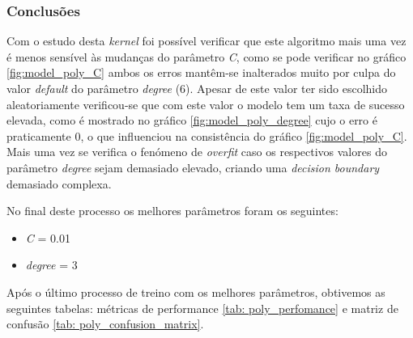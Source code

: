 \subsubsection{Conclusões}
Com o estudo desta \textit{kernel} foi possível verificar que este algoritmo mais uma vez é menos sensível às mudanças do parâmetro \textit{C}, como se pode verificar no gráfico \ref{fig:model_poly_C} ambos os erros mantêm-se inalterados muito por culpa do valor \textit{default} do parâmetro \textit{degree} (6). Apesar de este valor ter sido escolhido aleatoriamente verificou-se que com este valor o modelo tem um taxa de sucesso elevada, como é mostrado no gráfico \ref{fig:model_poly_degree} cujo o erro é praticamente 0, o que influenciou na consistência do gráfico \ref{fig:model_poly_C}.
Mais uma vez se verifica o fenómeno de \textit{overfit} caso os respectivos valores do parâmetro \textit{degree} sejam demasiado elevado, criando uma \textit{decision boundary} demasiado complexa.

No final deste processo os melhores parâmetros foram os seguintes:
\begin{itemize}
    \item \textit{C} = 0.01
    \item \textit{degree} = 3
\end{itemize}

Após o último processo de treino com os melhores parâmetros, obtivemos as seguintes tabelas: métricas de performance \ref{tab: poly_perfomance} e matriz de confusão \ref{tab: poly_confusion_matrix}.


